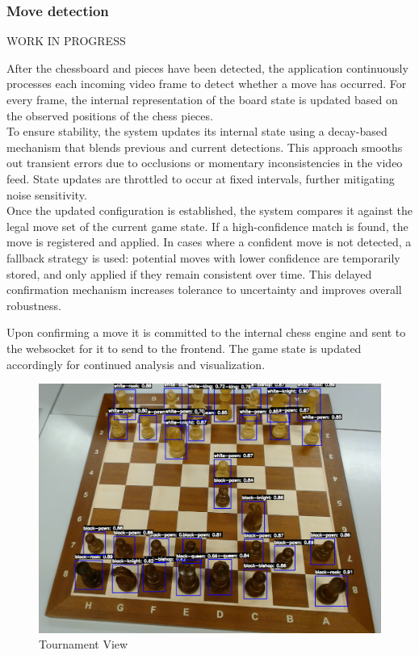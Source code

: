 \subsubsection*{Move detection}

WORK IN PROGRESS

After the chessboard and pieces have been detected, the application continuously processes each incoming video frame to detect whether a move has occurred. For every frame, the internal representation of the board state is updated based on the observed positions of the chess pieces. \\

To ensure stability, the system updates its internal state using a decay-based mechanism that blends previous and current detections. This approach smooths out transient errors due to occlusions or momentary inconsistencies in the video feed. State updates are throttled to occur at fixed intervals, further mitigating noise sensitivity. \\

Once the updated configuration is established, the system compares it against the legal move set of the current game state. If a high-confidence match is found, the move is registered and applied. In cases where a confident move is not detected, a fallback strategy is used: potential moves with lower confidence are temporarily stored, and only applied if they remain consistent over time. This delayed confirmation mechanism increases tolerance to uncertainty and improves overall robustness.

Upon confirming a move it is committed to the internal chess engine and sent to the websocket for it to send to the frontend. The game state is updated accordingly for continued analysis and visualization.



\begin{subfigure}[h!]{0.9\linewidth} \centering \includegraphics[width=\linewidth]{figures/methods/ml-models/piece-model.png} \caption{Tournament View} \end{subfigure}



